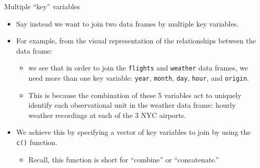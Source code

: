 \documentclass[
  ignorenonframetext,
]{beamer}
\providecommand{\tightlist}{%
  \setlength{\itemsep}{0pt}\setlength{\parskip}{0pt}}
\begin{document}
\begin{frame}[fragile]{Multiple ``key'' variables}
\protect\hypertarget{multiple-key-variables}{}
\begin{itemize}
\item
  Say instead we want to join two data frames by multiple key variables.
\item
  For example, from the visual representation of the relationships
  between the data frame:

  \begin{itemize}
  \tightlist
  \item
    we see that in order to join the \texttt{flights} and
    \texttt{weather} data frames, we need more than one key variable:
    \texttt{year}, \texttt{month}, \texttt{day}, \texttt{hour}, and
    \texttt{origin}.
  \item
    This is because the combination of these 5 variables act to uniquely
    identify each observational unit in the weather data frame: hourly
    weather recordings at each of the 3 NYC airports.
  \end{itemize}
\item
  We achieve this by specifying a vector of key variables to join by
  using the \texttt{c()} function.

  \begin{itemize}
  \tightlist
  \item
    Recall, this function is short for ``combine'' or ``concatenate.''
  \end{itemize}
\end{itemize}
\end{frame}
\end{document}
